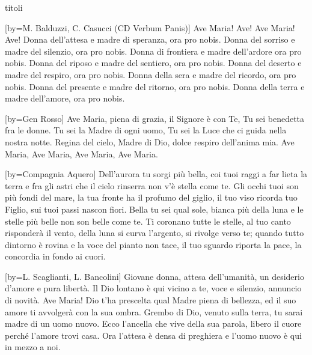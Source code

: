 \begin{songs}{titoli}

[by={M. Balduzzi, C. Casucci (CD Verbum Panis)}]
\beginchorus
Ave Maria! Ave!
Ave Maria! Ave!
\endchorus
\beginverse
Donna dell'attesa e madre di speranza, ora pro nobis.
Donna del sorriso e madre del silenzio, ora pro nobis.
Donna di frontiera e madre dell'ardore ora pro nobis.
Donna del riposo e madre del sentiero, ora pro nobis.
\endverse
\beginverse
Donna del deserto e madre del respiro, ora pro nobis.
Donna della sera e madre del ricordo, ora pro nobis.
Donna del presente e madre del ritorno, ora pro nobis.
Donna della terra e madre dell'amore, ora pro nobis.
\endverse
\endsong

[by={Gen Rosso}]
\beginverse
Ave Maria, piena di grazia,
il Signore è con Te,
Tu sei benedetta fra le donne.
Tu sei la Madre di ogni uomo,
Tu sei la Luce che ci guida nella nostra notte.
\endverse
\beginchorus
Regina del cielo, Madre di Dio,
dolce respiro dell'anima mia.
Ave Maria, Ave Maria,
Ave Maria, Ave Maria.
\endchorus
\endsong

[by={Compagnia Aquero}]
\beginverse
Dell'aurora tu sorgi più bella, coi tuoi raggi a far lieta la terra
e fra gli astri che il cielo rinserra non v'è stella come te.
Gli occhi tuoi son più fondi del mare,
la tua fronte ha il profumo del giglio,
il tuo viso ricorda tuo Figlio, sui tuoi passi nascon fiori.
\endverse
\beginchorus
Bella tu sei qual sole, bianca più della luna
e le stelle più belle non son belle come te. 
\endchorus
\beginverse
Ti coronano tutte le stelle, al tuo canto risponderà il vento,
della luna si curva l'argento, si rivolge verso te;
quando tutto dintorno è rovina
e la voce del pianto non tace,
il tuo sguardo riporta la pace, la concordia in fondo ai cuori.
\endverse
\endsong

[by={L. Scaglianti, L. Bancolini}]
\beginverse
Giovane donna, attesa dell'umanità,
un desiderio d'amore e pura libertà.
Il Dio lontano è qui vicino a te,
voce e silenzio, annuncio di novità.
\endverse
\beginchorus
Ave Maria! 
\endchorus
\beginverse
Dio t'ha prescelta qual Madre piena di bellezza,
ed il suo amore ti avvolgerà con la sua ombra.
Grembo di Dio, venuto sulla terra,
tu sarai madre di un uomo nuovo.
\endverse
\beginverse
Ecco l'ancella che vive della sua parola,
libero il cuore perché l'amore trovi casa.
Ora l'attesa è densa di preghiera
e l'uomo nuovo è qui in mezzo a noi.
\endverse
\endsong


\end{songs}

